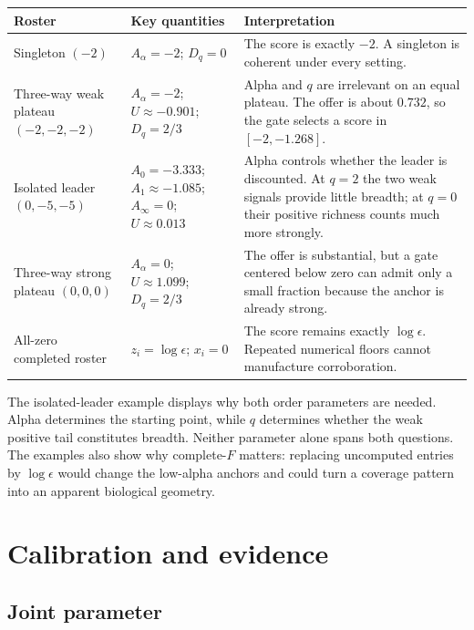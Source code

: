 \documentclass[11pt]{article}
\begin{document}
\begin{center}
\small
\begin{tabularx}{0.98\textwidth}{@{}>{\raggedright\arraybackslash}p{}>{\raggedright\arraybackslash}p{}>{\raggedright\arraybackslash}X@{}}
\toprule
Roster & Key quantities & Interpretation \\
\midrule
Singleton $(-2)$
& $A_\alpha=-2$; $D_q=0$
& The score is exactly $-2$. A singleton is coherent under every setting. \\
\addlinespace
Three-way weak plateau $(-2,-2,-2)$
& $A_\alpha=-2$; $U\approx-0.901$; $D_q=2/3$
& Alpha and $q$ are irrelevant on an equal plateau. The offer is about
$0.732$, so the gate selects a score in $[-2,-1.268]$. \\
\addlinespace
Isolated leader $(0,-5,-5)$
& $A_0=-3.333$; $A_1\approx-1.085$; $A_\infty=0$;
$U\approx0.013$
& Alpha controls whether the leader is discounted. At $q=2$ the two weak
signals provide little breadth; at $q=0$ their positive richness counts much
more strongly. \\
\addlinespace
Three-way strong plateau $(0,0,0)$
& $A_\alpha=0$; $U\approx1.099$; $D_q=2/3$
& The offer is substantial, but a gate centered below zero can admit only a
small fraction because the anchor is already strong. \\
\addlinespace
All-zero completed roster
& $z_i=\log\epsilon$; $x_i=0$
& The score remains exactly $\log\epsilon$. Repeated numerical floors cannot
manufacture corroboration. \\
\bottomrule
\end{tabularx}
\end{center}

The isolated-leader example displays why both order parameters are needed.
Alpha determines the starting point, while $q$ determines whether the weak
positive tail constitutes breadth. Neither parameter alone spans both
questions. The examples also show why complete-$F$ matters: replacing
uncomputed entries by $\log\epsilon$ would change the low-alpha anchors and
could turn a coverage pattern into an apparent biological geometry.

\section{Calibration and evidence}

\subsection{Joint parameter}
\end{document}
